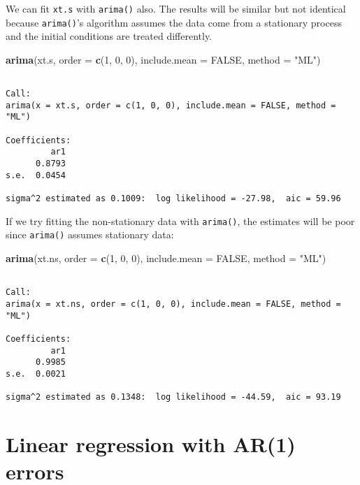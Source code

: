 \documentclass[12pt,]{book}
\newenvironment{Shaded}{\begin{snugshade}}{\end{snugshade}}
\newcommand{\DataTypeTok}[1]{\textcolor[rgb]{0.13,0.29,0.53}{#1}}
\newcommand{\DecValTok}[1]{\textcolor[rgb]{0.00,0.00,0.81}{#1}}
\newcommand{\KeywordTok}[1]{\textcolor[rgb]{0.13,0.29,0.53}{\textbf{#1}}}
\newcommand{\NormalTok}[1]{#1}
\newcommand{\OtherTok}[1]{\textcolor[rgb]{0.56,0.35,0.01}{#1}}
\newcommand{\StringTok}[1]{\textcolor[rgb]{0.31,0.60,0.02}{#1}}
\begin{document}
We can fit \texttt{xt.s} with \texttt{arima()} also. The results will be similar but not identical because \texttt{arima()}'s algorithm assumes the data come from a stationary process and the initial conditions are treated differently.

\begin{Shaded}
\begin{Highlighting}[]
\KeywordTok{arima}\NormalTok{(xt.s, }\DataTypeTok{order =} \KeywordTok{c}\NormalTok{(}\DecValTok{1}\NormalTok{, }\DecValTok{0}\NormalTok{, }\DecValTok{0}\NormalTok{), }\DataTypeTok{include.mean =} \OtherTok{FALSE}\NormalTok{, }\DataTypeTok{method =} \StringTok{"ML"}\NormalTok{)}
\end{Highlighting}
\end{Shaded}

\begin{verbatim}

Call:
arima(x = xt.s, order = c(1, 0, 0), include.mean = FALSE, method = "ML")

Coefficients:
         ar1
      0.8793
s.e.  0.0454

sigma^2 estimated as 0.1009:  log likelihood = -27.98,  aic = 59.96
\end{verbatim}

If we try fitting the non-stationary data with \texttt{arima()}, the estimates will be poor since \texttt{arima()} assumes stationary data:

\begin{Shaded}
\begin{Highlighting}[]
\KeywordTok{arima}\NormalTok{(xt.ns, }\DataTypeTok{order =} \KeywordTok{c}\NormalTok{(}\DecValTok{1}\NormalTok{, }\DecValTok{0}\NormalTok{, }\DecValTok{0}\NormalTok{), }\DataTypeTok{include.mean =} \OtherTok{FALSE}\NormalTok{, }\DataTypeTok{method =} \StringTok{"ML"}\NormalTok{)}
\end{Highlighting}
\end{Shaded}

\begin{verbatim}

Call:
arima(x = xt.ns, order = c(1, 0, 0), include.mean = FALSE, method = "ML")

Coefficients:
         ar1
      0.9985
s.e.  0.0021

sigma^2 estimated as 0.1348:  log likelihood = -44.59,  aic = 93.19
\end{verbatim}

\hypertarget{linear-regression-with-ar1-errors}{%
\section{Linear regression with AR(1) errors}\label{linear-regression-with-ar1-errors}}
\end{document}
